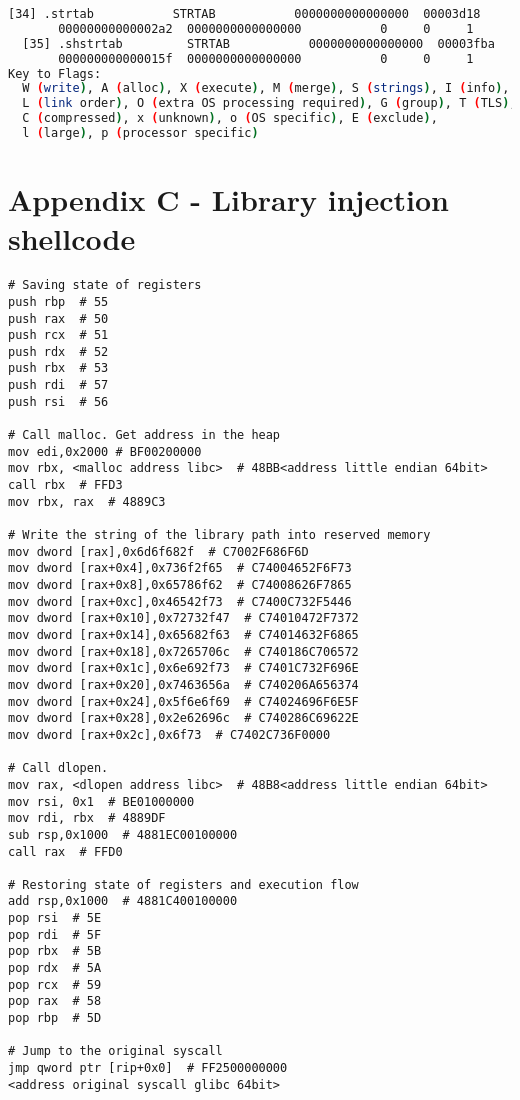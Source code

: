 \begin{lstlisting}[language=bash, caption={List of ELF section headers with readelf tool of a program compiled with GCC.}, label={code:elf_sections}]
  [34] .strtab           STRTAB           0000000000000000  00003d18
       00000000000002a2  0000000000000000           0     0     1
  [35] .shstrtab         STRTAB           0000000000000000  00003fba
       000000000000015f  0000000000000000           0     0     1
Key to Flags:
  W (write), A (alloc), X (execute), M (merge), S (strings), I (info),
  L (link order), O (extra OS processing required), G (group), T (TLS),
  C (compressed), x (unknown), o (OS specific), E (exclude),
  l (large), p (processor specific)
\end{lstlisting}


\chapter* {Appendix C - Library injection shellcode} \label{annex:shellcode}
\begin{lstlisting}[language={[x86masm]Assembler}, caption={Shellcode for library injection and its opcodes.}, label={code:shellcode}]
# Saving state of registers
push rbp  # 55
push rax  # 50
push rcx  # 51
push rdx  # 52
push rbx  # 53
push rdi  # 57
push rsi  # 56

# Call malloc. Get address in the heap
mov edi,0x2000 # BF00200000
mov rbx, <malloc address libc>  # 48BB<address little endian 64bit>               
call rbx  # FFD3
mov rbx, rax  # 4889C3

# Write the string of the library path into reserved memory
mov dword [rax],0x6d6f682f  # C7002F686F6D 
mov dword [rax+0x4],0x736f2f65  # C74004652F6F73
mov dword [rax+0x8],0x65786f62  # C74008626F7865
mov dword [rax+0xc],0x46542f73  # C7400C732F5446
mov dword [rax+0x10],0x72732f47  # C74010472F7372
mov dword [rax+0x14],0x65682f63  # C74014632F6865
mov dword [rax+0x18],0x7265706c  # C740186C706572
mov dword [rax+0x1c],0x6e692f73  # C7401C732F696E
mov dword [rax+0x20],0x7463656a  # C740206A656374
mov dword [rax+0x24],0x5f6e6f69  # C74024696F6E5F
mov dword [rax+0x28],0x2e62696c  # C740286C69622E
mov dword [rax+0x2c],0x6f73  # C7402C736F0000

# Call dlopen.
mov rax, <dlopen address libc>  # 48B8<address little endian 64bit>
mov rsi, 0x1  # BE01000000
mov rdi, rbx  # 4889DF
sub rsp,0x1000  # 4881EC00100000
call rax  # FFD0

# Restoring state of registers and execution flow
add rsp,0x1000  # 4881C400100000
pop rsi  # 5E
pop rdi  # 5F
pop rbx  # 5B
pop rdx  # 5A
pop rcx  # 59
pop rax  # 58
pop rbp  # 5D

# Jump to the original syscall
jmp qword ptr [rip+0x0]  # FF2500000000
<address original syscall glibc 64bit>

\end{lstlisting}


